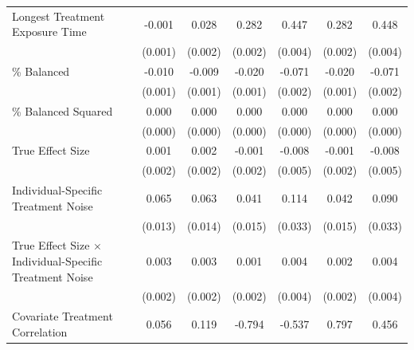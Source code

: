 \documentclass[12pt]{article}
\begin{document}
\begin{table}[htbp]
{\begin{tabular}{p{4.5in}|*{6}{c}}
Longest Treatment Exposure Time&      -0.001         &       0.028\sym{***}&       0.282\sym{***}&       0.447\sym{***}&       0.282\sym{***}&       0.448\sym{***}\\
                    &     (0.001)         &     (0.002)         &     (0.002)         &     (0.004)         &     (0.002)         &     (0.004)         \\
\% Balanced          &      -0.010\sym{***}&      -0.009\sym{***}&      -0.020\sym{***}&      -0.071\sym{***}&      -0.020\sym{***}&      -0.071\sym{***}\\
                    &     (0.001)         &     (0.001)         &     (0.001)         &     (0.002)         &     (0.001)         &     (0.002)         \\
\% Balanced Squared  &       0.000\sym{***}&       0.000\sym{***}&       0.000\sym{***}&       0.000\sym{***}&       0.000\sym{***}&       0.000\sym{***}\\
                    &     (0.000)         &     (0.000)         &     (0.000)         &     (0.000)         &     (0.000)         &     (0.000)         \\
True Effect Size    &       0.001         &       0.002         &      -0.001         &      -0.008         &      -0.001         &      -0.008         \\
                    &     (0.002)         &     (0.002)         &     (0.002)         &     (0.005)         &     (0.002)         &     (0.005)         \\
Individual-Specific Treatment Noise&       0.065\sym{***}&       0.063\sym{***}&       0.041\sym{**} &       0.114\sym{***}&       0.042\sym{**} &       0.090\sym{**} \\
                    &     (0.013)         &     (0.014)         &     (0.015)         &     (0.033)         &     (0.015)         &     (0.033)         \\
True Effect Size $\times$ Individual-Specific Treatment Noise&       0.003         &       0.003         &       0.001         &       0.004         &       0.002         &       0.004         \\
                    &     (0.002)         &     (0.002)         &     (0.002)         &     (0.004)         &     (0.002)         &     (0.004)         \\
Covariate Treatment Correlation&       0.056\sym{**} &       0.119\sym{***}&      -0.794\sym{***}&      -0.537\sym{***}&       0.797\sym{***}&       0.456\sym{***}\\

\end{tabular}}
\end{table}
\end{document}
